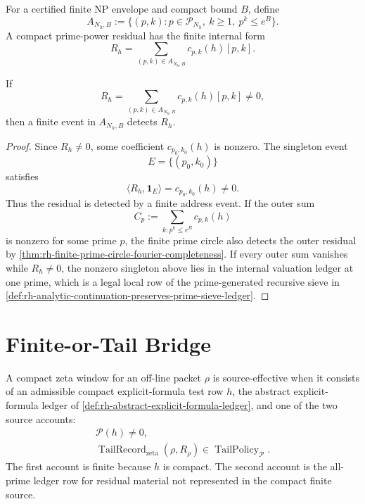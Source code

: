 \begin{definition}
\label{def:rh-prime-power-internal-address-space}
For a certified finite NP envelope and compact bound $B$, define
$$
A_{N_h,B}
:=
\{(p,k):p\in\mathcal P_{N_h},\ k\ge1,\ p^k\le e^B\}.
$$
A compact prime-power residual has the finite internal form
$$
R_h=\sum_{(p,k)\in A_{N_h,B}}c_{p,k}(h)[p,k].
$$
\end{definition}

\begin{theorem}
\label{thm:rh-prime-power-residual-has-finite-address-detector}
If
$$
R_h=\sum_{(p,k)\in A_{N_h,B}}c_{p,k}(h)[p,k]\ne0,
$$
then a finite event in $A_{N_h,B}$ detects $R_h$.
\end{theorem}

\begin{proof}
Since $R_h\ne0$, some coefficient $c_{p_0,k_0}(h)$ is nonzero.  The
singleton event
$$
E=\{(p_0,k_0)\}
$$
satisfies
$$
\langle R_h,\mathbf 1_E\rangle=c_{p_0,k_0}(h)\ne0.
$$
Thus the residual is detected by a finite address event.  If the
outer sum
$$
C_p:=\sum_{k:p^k\le e^B}c_{p,k}(h)
$$
is nonzero for some prime $p$, the finite prime circle also detects the
outer residual by
\autoref{thm:rh-finite-prime-circle-fourier-completeness}.  If every
outer sum vanishes while $R_h\ne0$, the nonzero singleton above lies in
the internal valuation ledger at one prime, which is a legal local row
of the prime-generated recursive sieve in
\autoref{def:rh-analytic-continuation-preserves-prime-sieve-ledger}.
\end{proof}

\section{Finite-or-Tail Bridge}
\label{sec:rh-global-window-finite-or-tail-bridge}

\begin{definition}
\label{def:rh-source-effective-compact-zeta-window}
A compact zeta window for an off-line packet $\rho$ is
source-effective when it consists of an admissible compact
explicit-formula test row $h$, the abstract explicit-formula ledger of
\autoref{def:rh-abstract-explicit-formula-ledger}, and one of the two
source accounts:
$$
\begin{gathered}
\mathcal P(h)\ne0,\\
\operatorname{TailRecord}_{\mathrm{zeta}}(\rho,R_\rho)
\in\operatorname{TailPolicy}_{\mathcal P}.
\end{gathered}
$$
The first account is finite because $h$ is compact.  The second account
is the all-prime ledger row for residual material not represented in
the compact finite source.
\end{definition}

